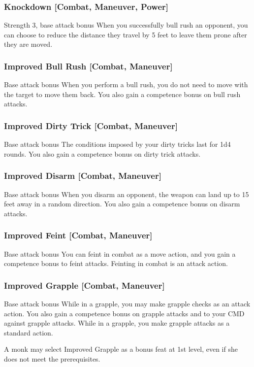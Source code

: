 \subsubsection{Knockdown [Combat, Maneuver, Power]}
\featpres Strength 3, base attack bonus 
\featben When you successfully bull rush an opponent, you can choose to reduce the distance they travel by 5 feet to leave them prone after they are moved.

\subsubsection{Improved Bull Rush [Combat, Maneuver]}
 Base attack bonus 
 When you perform a bull rush, you do not need to move with the target to move them back. You also gain a  competence bonus on bull rush attacks.

\subsubsection{Improved Dirty Trick [Combat, Maneuver]}
 Base attack bonus 
 The conditions imposed by your dirty tricks last for 1d4 rounds. You also gain a  competence bonus on dirty trick attacks.

\subsubsection{Improved Disarm [Combat, Maneuver]}
 Base attack bonus 
 When you disarm an opponent, the weapon can land up to 15 feet away in a random direction. You also gain a  competence bonus on disarm attacks.

\subsubsection{Improved Feint [Combat, Maneuver]}
 Base attack bonus 
 You can feint in combat as a move action, and you gain a  competence bonus to feint attacks.
 Feinting in combat is an attack action.

\subsubsection{Improved Grapple [Combat, Maneuver]}
 Base attack bonus 
 While in a grapple, you may make grapple checks as an attack action. You also gain a  competence bonus on grapple attacks and to your CMD against grapple attacks.
 While in a grapple, you make grapple attacks as a standard action.
\par A monk may select Improved Grapple as a bonus feat at 1st level, even if she does not meet the prerequisites.

